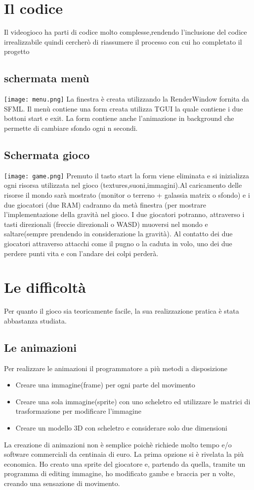 \section{Il codice}
Il videogioco ha parti di codice molto complesse,rendendo l'inclusione del codice irrealizzabile quindi cercherò di riassumere il processo con cui ho completato il progetto

\subsection{schermata menù}
\texttt{[image: menu.png]}
La finestra è creata utilizzando la RenderWindow fornita da SFML.
Il menù contiene una form creata utilizza TGUI la quale contiene i due bottoni start e exit. La form contiene anche l'animazione in background che permette di cambiare sfondo ogni n secondi.
\subsection{Schermata gioco}
\texttt{[image: game.png]}
Premuto il tasto start la form viene eliminata e si inizializza ogni risorsa utilizzata nel gioco (textures,suoni,immagini).Al caricamento delle risorse il mondo sarà mostrato (monitor o terreno + galassia matrix o sfondo) e i due giocatori (due RAM) cadranno da metà finestra (per mostrare l'implementazione della gravità nel gioco. I due giocatori potranno, attraverso i tasti direzionali (freccie direzionali o WASD) muoversi nel mondo e saltare(sempre prendendo in considerazione la gravità). Al contatto dei due giocatori attraverso attacchi come il pugno o la caduta in volo, uno dei due perdere punti vita e con l'andare dei colpi perderà.
\section{Le difficoltà}
Per quanto il gioco sia teoricamente facile, la sua realizzazione pratica è stata abbastanza studiata.
\subsection{Le animazioni}
Per realizzare le animazioni il programmatore a più metodi a disposizione
\begin{itemize}
\item Creare una immagine(frame) per ogni parte del movimento
\item Creare una sola immagine(sprite) con uno scheletro ed utilizzare le matrici di trasformazione per modificare l'immagine
\item Creare un modello 3D con scheletro e considerare solo due dimensioni
\end{itemize}
La creazione di animazioni non è semplice poichè richiede molto tempo e/o software commerciali da centinaia di euro. La prima opzione si è rivelata la più economica. Ho creato una sprite del giocatore e, partendo da quella, tramite un programma di editing immagine, ho modificato gambe e braccia per n volte, creando una sensazione di movimento.
